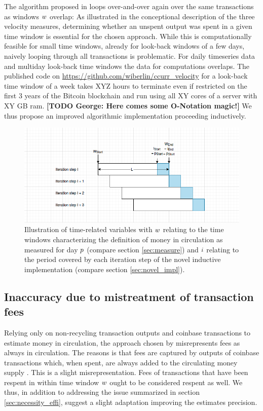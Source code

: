 The algorithm proposed in \cite{pernice2019cryptocurrencies} loops over-and-over again over the same transactions as windows \({w}\) overlap: %
As illustrated in the conceptional description of the three velocity measures, determining whether an unspent output was spent in a given time window is essential for the chosen approach. %
While this is computationally feasible for small time windows, already for look-back windows of a few days, naively looping through all transactions is problematic. %
For daily timeseries data and multiday look-back time windows the data for computations overlaps. %
The published code on \url{https://github.com/wiberlin/ccurr_velocity} for a look-back time window of a week takes XYZ hours to terminate even if restricted on the first 3 years of the Bitcoin blockchain and run using all XY cores of a server with XY GB ram. 
\textbf{[TODO George: Here comes some O-Notation magic!]}
We thus propose an improved algorithmic implementation proceeding inductively. %


\begin{figure}
  \centerline{%
    \ifdefined\varInputFigs%
    \includegraphics[width=0.8\linewidth]{fig/period_variables}%
    \else%
    \fi%
  }%
  \caption{Illustration of time-related variables with \({w}\) relating to the time windows characterizing the definition of money in circulation as measured for day \({p}\) (compare section \ref{sec:measure}) and \({i}\) relating to the period covered by each iteration step of the novel inductive implementation (compare section \ref{sec:novel_impl}).}
  \label{fig:timevars}
\end{figure}
%

\subsection{Inaccuracy due to mistreatment of transaction fees}
\label{sec:inaccuracy_fees}%
Relying only on non-recycling transaction outputs and coinbase transactions to estimate money in circulation, the approach chosen by \cite{pernice2019cryptocurrencies} misrepresents fees as always in circulation. %
The reasons is that fees are captured by outputs of coinbase transactions which, when spent, are always added to the circulating money supply . %
This is a slight misrepresentation. %
Fees of transactions that have been respent in within time window \({w}\) ought to be considered respent as well. %
We thus, in addition to addressing the issue summarized in section \ref{sec:necessity_effi}, suggest a slight adaptation improving the estimates precision. %

